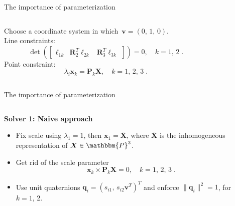 \documentclass[aspectratio=169]{beamer}
\renewcommand{\P}{\ensuremath{\mathbbm{P}}}
\newcommand{\mat}[1]{\bm{#1}}
\newcommand{\norm}[1]{\|#1\|}
\newcommand{\T}{T}
\begin{document}
\begin{frame}{The importance of parameterization}
\begin{columns}
    \begin{column}{0.5\textwidth}
        Choose a coordinate system in which~$\mat{v}=(0,\,1,\,0)$.\\[5mm]
        Line constraints:
        \[
            \det\!\left(\begin{bmatrix}
                    \mat{\ell}_{1k} &
                    \mat{R}_2^\T\mat{\ell}_{2k} &
                    \mat{R}_3^\T\mat{\ell}_{3k}
                \end{bmatrix}\right) = 0,
        \quad k = 1,\,2\;.
        \]
        Point constraint:
        \[
            \lambda_i\mat{x}_k = \mat{P}_k\mat{X},  \quad k=1,\,2,\, 3\;.
        \]
    \end{column}%
    \begin{column}{0.5\textwidth}
        \centering
        
    \end{column}
\end{columns}
\end{frame}

\begin{frame}{The importance of parameterization}
\begin{columns}
    \begin{column}{0.5\textwidth}
        \textbf{Solver 1: Naive approach}

        \begin{itemize}
            \item Fix scale using $\lambda_1 = 1$, then $\mat{x}_1=\bar{\mat{X}}$, where $\bar{\mat{X}}$ is the inhomogeneous representation of $\mat{X}\in\P^3$.
            \item Get rid of the scale parameter
            \[
                \mat{x}_k \times \mat{P}_k\mat{X} = 0,  \quad k=1,\,2,\, 3\;.
            \]
            \item Use unit quaternions $\mat{q}_i = (s_{i1},\,s_{i2}\mat{v}^\T)^\T$ and
                  enforce $\norm{\mat{q}_i}^2=1$, for $k=1$, 2.
        \end{itemize}

    \end{column}%
    \begin{column}{0.5\textwidth}
        \centering
        
    \end{column}
\end{columns}
\end{frame}
\end{document}
